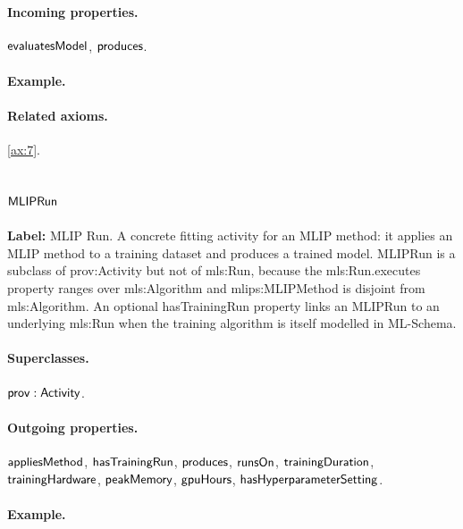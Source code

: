 \paragraph{Incoming properties.} $\mathsf{evaluatesModel}$, $\mathsf{produces}$.

\paragraph{Example.}

\paragraph{Related axioms.} \eqref{ax:7}.

\subsection{$\mathsf{MLIPRun}$}
\label{sec:term-MLIPRun}

\textbf{Label:} MLIP Run.
A concrete fitting activity for an MLIP method: it applies an MLIP method to a training dataset and produces a trained model. MLIPRun is a subclass of prov:Activity but not of mls:Run, because the mls:Run.executes property ranges over mls:Algorithm and mlips:MLIPMethod is disjoint from mls:Algorithm. An optional hasTrainingRun property links an MLIPRun to an underlying mls:Run when the training algorithm is itself modelled in ML-Schema.

\paragraph{Superclasses.} $\mathsf{prov:Activity}$.

\paragraph{Outgoing properties.} $\mathsf{appliesMethod}$, $\mathsf{hasTrainingRun}$, $\mathsf{produces}$, $\mathsf{runsOn}$, $\mathsf{trainingDuration}$, $\mathsf{trainingHardware}$, $\mathsf{peakMemory}$, $\mathsf{gpuHours}$, $\mathsf{hasHyperparameterSetting}$.

\paragraph{Example.}

